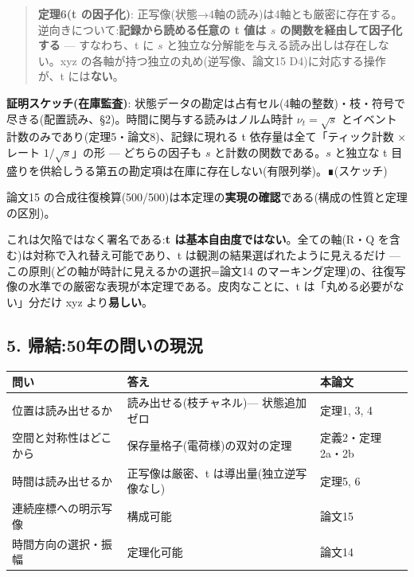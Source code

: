 \documentclass[
]{ltjsarticle}
\newcounter{none} %
\begin{document}
\begin{quote}
\textbf{定理6(t の因子化)}:
正写像(状態→4軸の読み)は4軸とも厳密に存在する。逆向きについて:\textbf{記録から読める任意の
t 値は \(s\) の関数を経由して因子化する} --- すなわち、t に \(s\)
と独立な分解能を与える読み出しは存在しない。xyz
の各軸が持つ独立の丸め(逆写像、論文15 D4)に対応する操作が、t
には\textbf{ない}。
\end{quote}

\textbf{証明スケッチ(在庫監査)}:
状態データの勘定は占有セル(4軸の整数)・枝・符号で尽きる(配置読み、§2)。時間に関与する読みはノルム時計
\(\nu_t=\sqrt{s}\) とイベント計数のみであり(定理5・論文8)、記録に現れる
t 依存量は全て「ティック計数 × レート \(1/\sqrt{s}\)」の形 ---
どちらの因子も \(s\) と計数の関数である。\(s\) と独立な t
目盛りを供給しうる第五の勘定項は在庫に存在しない(有限列挙)。∎(スケッチ)

論文15
の合成往復検算(500/500)は本定理の\textbf{実現の確認}である(構成の性質と定理の区別)。

これは欠陥ではなく署名である:\textbf{t
は基本自由度ではない}。全ての軸(R・Q
を含む)は対称で入れ替え可能であり、t
は観測の結果選ばれたように見えるだけ ---
この原則(どの軸が時計に見えるかの選択=論文14
のマーキング定理)の、往復写像の水準での厳密な表現が本定理である。皮肉なことに、t
は「丸める必要がない」分だけ xyz より\textbf{易しい}。

\subsection{5.
帰結:50年の問いの現況}\label{ux5e30ux7d5050ux5e74ux306eux554fux3044ux306eux73feux6cc1}

{\def\LTcaptype{none} %
\begin{longtable}[]{@{}
  >{\raggedright\arraybackslash}p{}
  >{\raggedright\arraybackslash}p{}
  >{\raggedright\arraybackslash}p{}@{}}
\toprule\noalign{}
\begin{minipage}[b]{\linewidth}\raggedright
問い
\end{minipage} & \begin{minipage}[b]{\linewidth}\raggedright
答え
\end{minipage} & \begin{minipage}[b]{\linewidth}\raggedright
本論文
\end{minipage} \\
\midrule\noalign{}
\endhead
\bottomrule\noalign{}
\endlastfoot
位置は読み出せるか & 読み出せる(枝チャネル)--- 状態追加ゼロ & 定理1, 3,
4 \\
空間と対称性はどこから & 保存量格子(電荷様)の双対の定理 &
定義2・定理2a・2b \\
時間は読み出せるか & 正写像は厳密、t は導出量(独立逆写像なし) & 定理5,
6 \\
連続座標への明示写像 & 構成可能 & 論文15 \\
時間方向の選択・振幅 & 定理化可能 & 論文14 \\
\end{longtable}
}
\end{document}
